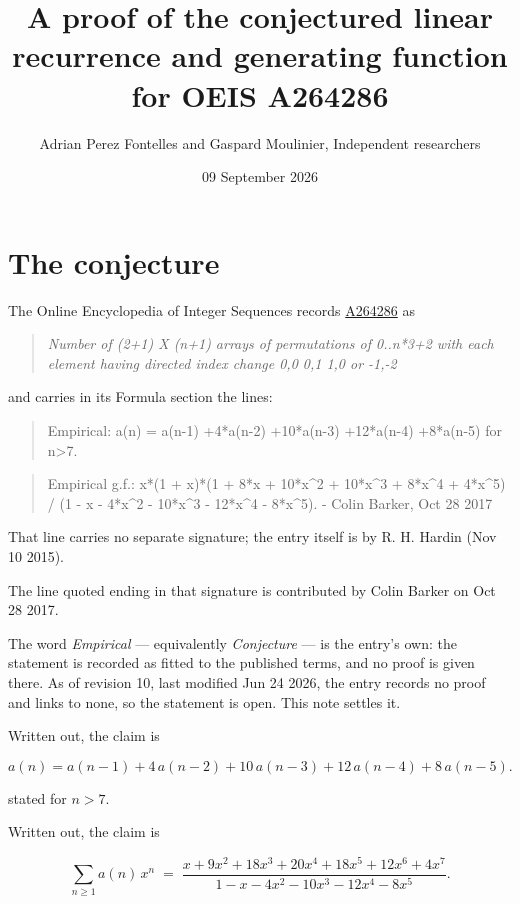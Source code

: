 \documentclass[11pt]{article}
\title{A proof of the conjectured linear recurrence and generating function for OEIS A264286}
\author{Adrian Perez Fontelles and Gaspard Moulinier, Independent researchers}
\date{09 September 2026}
\theoremstyle{definition}
\begin{document}
\maketitle
\section{The conjecture}

The Online Encyclopedia of Integer Sequences records \href{https://oeis.org/A264286}{A264286} as

\begin{quote}\itshape Number of (2+1) X (n+1) arrays of permutations of 0..n*3+2 with each element having directed index change 0,0 0,1 1,0 or -1,-2\end{quote}

and carries in its Formula section the lines:

\begin{quote}\ttfamily Empirical: a(n) = a(n-1) +4*a(n-2) +10*a(n-3) +12*a(n-4) +8*a(n-5) for n>7.\end{quote}

\begin{quote}\ttfamily Empirical g.f.: x*(1 + x)*(1 + 8*x + 10*x\textasciicircum{}2 + 10*x\textasciicircum{}3 + 8*x\textasciicircum{}4 + 4*x\textasciicircum{}5) / (1 - x - 4*x\textasciicircum{}2 - 10*x\textasciicircum{}3 - 12*x\textasciicircum{}4 - 8*x\textasciicircum{}5). - Colin Barker, Oct 28 2017\end{quote}

That line carries no separate signature; the entry itself is by R. H. Hardin (Nov 10 2015).

The line quoted ending in that signature is contributed by Colin Barker on Oct 28 2017.

The word {\itshape Empirical} --- equivalently {\itshape Conjecture} --- is the entry's own: the statement is recorded as fitted to the published terms, and no proof is given there. As of revision 10, last modified Jun 24 2026, the entry records no proof and links to none, so the statement is open. This note settles it.

Written out, the claim is

\[a(n) = a(n-1) + 4\,a(n-2) + 10\,a(n-3) + 12\,a(n-4) + 8\,a(n-5).\]

stated for $n > 7$.

Written out, the claim is

\[\sum_{n \ge 1} a(n)\,x^n \;=\; \frac{x + 9x^{2} + 18x^{3} + 20x^{4} + 18x^{5} + 12x^{6} + 4x^{7}}{1 - x - 4x^{2} - 10x^{3} - 12x^{4} - 8x^{5}}.\]
\end{document}
